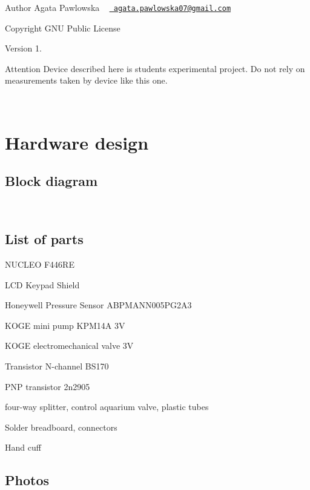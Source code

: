 \begin{DoxyAuthor}{Author}
Agata Pawlowska ~\newline
 \href{mailto:agata.pawlowska07@gmail.com}{\texttt{ agata.\+pawlowska07@gmail.\+com}} 
\end{DoxyAuthor}
\begin{DoxyCopyright}{Copyright}
G\+NU Public License 
\end{DoxyCopyright}
\begin{DoxyVersion}{Version}
1. ~\newline
 
\end{DoxyVersion}
\begin{DoxyAttention}{Attention}
Device described here is student\textquotesingle{}s experimental project. Do not rely on measurements taken by device like this one. ~\newline

\end{DoxyAttention}
~\newline
\hypertarget{index_hardware_design}{}\section{Hardware design}\label{index_hardware_design}
\hypertarget{index_diagram}{}\subsection{Block diagram}\label{index_diagram}
 ~\newline
 \hypertarget{index_list}{}\subsection{List of parts}\label{index_list}

\begin{DoxyItemize}
\item N\+U\+C\+L\+EO F446\+RE
\item L\+CD Keypad Shield
\item Honeywell Pressure Sensor A\+B\+P\+M\+A\+N\+N005\+P\+G2\+A3
\item K\+O\+GE mini pump K\+P\+M14A 3V
\item K\+O\+GE electromechanical valve 3V
\item Transistor N-\/channel B\+S170
\item P\+NP transistor 2n2905
\item four-\/way splitter, control aquarium valve, plastic tubes
\item Solder breadboard, connectors
\item Hand cuff
\end{DoxyItemize}\hypertarget{index_photos}{}\subsection{Photos}\label{index_photos}
    ~\newline


